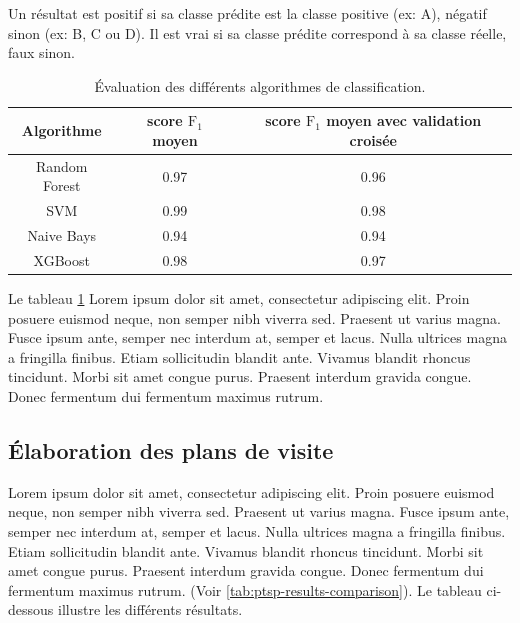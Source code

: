 Un résultat est positif si sa classe prédite est la classe positive (ex: A), négatif sinon (ex: B, C ou D). Il est vrai si sa classe prédite correspond à sa classe réelle, faux sinon.


\begin{table}[h!]
    \centering
    \begin{tabular}{|c|c|c|}
        \hline
        Algorithme & score $\text{F}_1$ moyen  & score $\text{F}_1$ moyen avec validation croisée \\
        \hline
         Random Forest & 0.97 &  0.96 \\
        \hline
         SVM & 0.99 & 0.98 \\
        \hline
        Naive Bays & 0.94 &  0.94 \\
        \hline
        XGBoost & 0.98 &  0.97\\
        \hline
    \end{tabular}
    \caption{Évaluation des différents algorithmes de classification.}
    \label{tab:f1-scores}
\end{table}
\FloatBarrier


Le tableau \ref{tab:f1-scores} Lorem ipsum dolor sit amet, consectetur adipiscing elit. Proin posuere euismod neque, non semper nibh viverra sed. Praesent ut varius magna. Fusce ipsum ante, semper nec interdum at, semper et lacus. Nulla ultrices magna a fringilla finibus. Etiam sollicitudin blandit ante. Vivamus blandit rhoncus tincidunt. Morbi sit amet congue purus. Praesent interdum gravida congue. Donec fermentum dui fermentum maximus rutrum.

\subsection{Élaboration des plans de visite}
Lorem ipsum dolor sit amet, consectetur adipiscing elit. Proin posuere euismod neque, non semper nibh viverra sed. Praesent ut varius magna. Fusce ipsum ante, semper nec interdum at, semper et lacus. Nulla ultrices magna a fringilla finibus. Etiam sollicitudin blandit ante. Vivamus blandit rhoncus tincidunt. Morbi sit amet congue purus. Praesent interdum gravida congue. Donec fermentum dui fermentum maximus rutrum. (Voir \ref{tab:ptsp-results-comparison}). Le tableau ci-dessous illustre les différents résultats.


